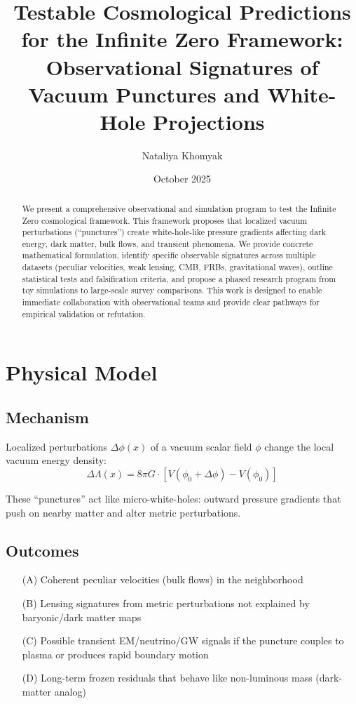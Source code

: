 \documentclass[11pt,a4paper]{article}
\title{Testable Cosmological Predictions for the Infinite Zero Framework: \\
Observational Signatures of Vacuum Punctures and White-Hole Projections}
\author{Nataliya Khomyak}
\date{October 2025}
\begin{document}
\maketitle

\begin{abstract}
We present a comprehensive observational and simulation program to test the Infinite Zero cosmological framework. This framework proposes that localized vacuum perturbations (``punctures'') create white-hole-like pressure gradients affecting dark energy, dark matter, bulk flows, and transient phenomena. We provide concrete mathematical formulation, identify specific observable signatures across multiple datasets (peculiar velocities, weak lensing, CMB, FRBs, gravitational waves), outline statistical tests and falsification criteria, and propose a phased research program from toy simulations to large-scale survey comparisons. This work is designed to enable immediate collaboration with observational teams and provide clear pathways for empirical validation or refutation.
\end{abstract}

\section{Physical Model}

\subsection{Mechanism}

Localized perturbations $\Delta\phi(x)$ of a vacuum scalar field $\phi$ change the local vacuum energy density:
\begin{equation}
\Delta\Lambda(x) = 8\pi G\cdot[V(\phi_0+\Delta\phi) - V(\phi_0)]
\end{equation}

These ``punctures'' act like micro-white-holes: outward pressure gradients that push on nearby matter and alter metric perturbations.

\subsection{Outcomes}

\begin{itemize}
\item[(A)] Coherent peculiar velocities (bulk flows) in the neighborhood
\item[(B)] Lensing signatures from metric perturbations not explained by baryonic/dark matter maps
\item[(C)] Possible transient EM/neutrino/GW signals if the puncture couples to plasma or produces rapid boundary motion
\item[(D)] Long-term frozen residuals that behave like non-luminous mass (dark-matter analog)
\end{itemize}
\end{document}
